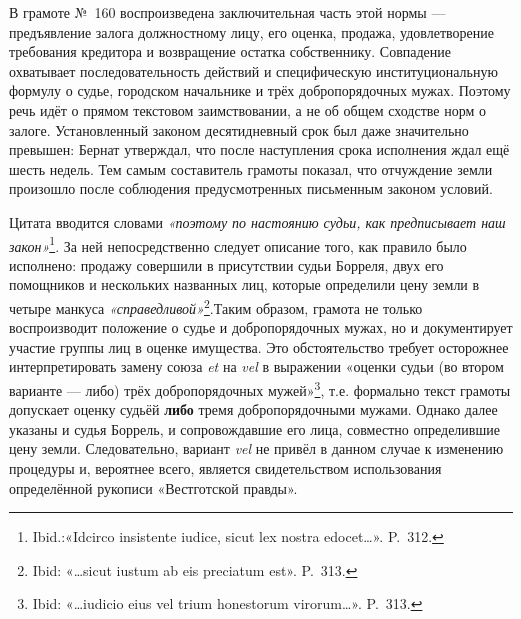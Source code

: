 В грамоте №~160 воспроизведена заключительная часть этой нормы --- предъявление залога должностному лицу, его оценка, продажа, удовлетворение требования кредитора и возвращение остатка собственнику. Совпадение охватывает последовательность действий и специфическую институциональную формулу о судье, городском начальнике и трёх добропорядочных мужах. Поэтому речь идёт о прямом текстовом заимствовании, а не об общем сходстве норм о залоге. Установленный законом десятидневный срок был даже значительно превышен: Бернат утверждал, что после наступления срока исполнения ждал ещё шесть недель. Тем самым составитель грамоты показал, что отчуждение земли произошло после соблюдения предусмотренных письменным законом условий.

Цитата вводится словами \emph{«поэтому по настоянию судьи, как предписывает наш закон»}\footnote{Ibid.:«Idcirco insistente iudice, sicut lex nostra edocet…». P.~312.}. За ней непосредственно следует описание того, как правило было исполнено: продажу совершили в присутствии судьи Борреля, двух его помощников и нескольких названных лиц, которые определили цену земли в четыре манкуса \emph{«}\emph{справедлив}\emph{ой}\emph{»}\footnote{Ibid: «…sicut iustum ab eis preciatum est». P.~313.}.Таким образом, грамота не только воспроизводит положение о судье и добропорядочных мужах, но и документирует участие группы лиц в оценке имущества. Это обстоятельство требует осторожнее интерпретировать замену союза \emph{et} на \emph{vel} в выражении «оценки судьи  (во втором варианте --- либо) трёх добропорядочных мужей»\footnote{Ibid: «…iudicio eius vel trium honestorum virorum…». P.~313.}, т.е. формально текст грамоты допускает оценку судьёй \textbf{либо} тремя добропорядочными мужами. Однако далее указаны и судья Боррель, и сопровождавшие его лица, совместно определившие цену земли. Следовательно, вариант \emph{vel} не привёл в данном случае к изменению процедуры и, вероятнее всего, является свидетельством использования определённой рукописи «Вестготской правды».


